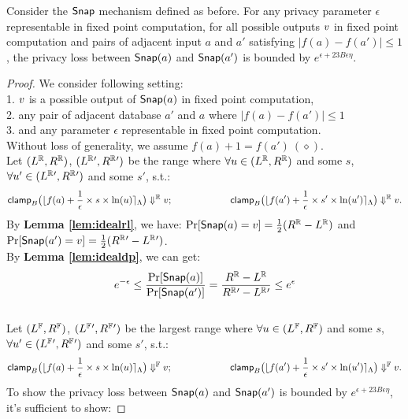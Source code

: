 \documentclass[a4paper,11pt]{article}
\begin{document}
\begin{thm}
%
Consider the $\mathsf{Snap}$ mechanism defined as before. For any privacy parameter $\epsilon$ representable in fixed point computation, for all possible outputs $v$ in fixed point computation and pairs of adjacent input $a$ and $a'$ satisfying $|f(a) - f(a')| \leq 1$, the privacy loss between $\mathsf{Snap}(a)$ and $\mathsf{Snap}(a')$ is bounded by $e^{\epsilon + 23 B \epsilon \eta}$.
\end{thm}

\begin{proof}
%
%
We consider following setting:
\\
1. $v$ is a possible output of $\mathsf{Snap}(a)$ in fixed point computation,
%
\\
2. any pair of adjacent database $a'$ and $a$ where $|f(a) - f(a')| \leq 1$
%
\\
3. and any parameter $\epsilon$ representable in fixed point computation.
%
\\
Without loss of generality, we assume $f(a) + 1 = f(a') ~ (\diamond)$.
%
\\
%
%
Let $(L^{\mathbb{R}}, R^{\mathbb{R}})$, $(L^{\mathbb{R}}{'}, R^{\mathbb{R}}{'})$ be the range where 
$\forall u \in (L^{\mathbb{R}}, R^{\mathbb{R}})$ and some $s$, 
$\forall u' \in (L^{\mathbb{R}}{'}, R^{\mathbb{R}}{'})$ and some $s'$, s.t.:
%
$$\mathsf{clamp}_B \big(
	\lfloor f(a) + \frac{1}{\epsilon} \times s \times \ln (u) \rceil_{\Lambda}
	\big)
	 \Downarrow^{\mathbb{R}} v; 
~~~~~~~~~~~~~~~~~~
\mathsf{clamp}_B \big(
	\lfloor f(a') + \frac{1}{\epsilon} \times s' \times \ln (u') \rceil_{\Lambda}
	\big)
	 \Downarrow^{\mathbb{R}} v.$$
%
By \textbf{Lemma \ref{lem:idealrl}}, we have:
$\Pr[\mathsf{Snap}(a) = v] = \frac{1}{2} (R^{\mathbb{R}} - L^{\mathbb{R}})$ 
and $\Pr[\mathsf{Snap}(a') = v] = \frac{1}{2} (R^{\mathbb{R}}{'} - L^{\mathbb{R}}{'})$.
%
\\
%
By \textbf{Lemma \ref{lem:idealdp}}, we can get:
\[
	e^{-\epsilon} \leq \frac{\Pr[\mathsf{Snap}(a)]}{\Pr[\mathsf{Snap}(a')]}
	= \frac{R^{\mathbb{R}} - L^{\mathbb{R}}}{R^{\mathbb{R}}{'} - L^{\mathbb{R}}{'}} \leq e^{\epsilon}
\]
%
\\
%
Let $(L^{\mathbb{F}}, R^{\mathbb{F}})$, $(L^{\mathbb{F}}{'}, R^{\mathbb{F}}{'})$ be the largest range where 
$\forall u \in (L^{\mathbb{F}}, R^{\mathbb{F}})$ and some $s$, 
$\forall u' \in (L^{\mathbb{F}}{'}, R^{\mathbb{F}}{'})$ and some $s'$, s.t.:
%
$$
\mathsf{clamp}_B \big(
	\lfloor f(a) + \frac{1}{\epsilon} \times s \times \ln (u) \rceil_{\Lambda}
	\big)
	\Downarrow^{\mathbb{F}} v; 
~~~~~~~~~~~~~~~~~~
\mathsf{clamp}_B \big(
	\lfloor f(a') + \frac{1}{\epsilon} \times s' \times \ln (u') \rceil_{\Lambda}
	\big)
	\Downarrow^{\mathbb{F}} v.$$
%
To show the privacy loss between $\mathsf{Snap}(a)$ and $\mathsf{Snap}(a')$ is bounded by $e^{\epsilon + 23 B \epsilon \eta}$, it’s sufficient to show:

\end{proof}
\end{document}
